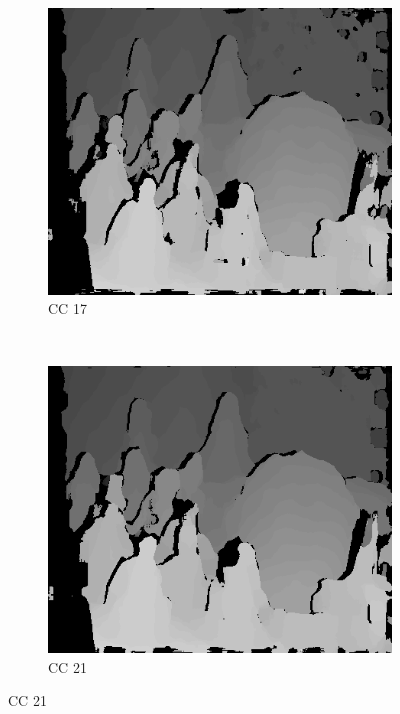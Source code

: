 \begin{figure}
\begin{subfigure}[b]{0.23\textwidth}
    \centering
    \includegraphics[width=\textwidth]{images/stereo-pairs/cones_dual_crosschecked_17.png}
    \caption{CC 17}
  \end{subfigure}
  ~
  \begin{subfigure}[b]{0.23\textwidth}
    \centering
    \includegraphics[width=\textwidth]{images/stereo-pairs/cones_dual_crosschecked_21.png}
    \caption{CC 21}
  \end{subfigure}



\end{figure}
